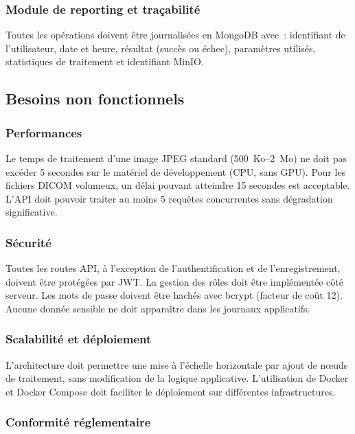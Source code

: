 \subsubsection{Module de reporting et traçabilité}

Toutes les opérations doivent être journalisées en MongoDB avec~: identifiant de l'utilisateur, date et heure, résultat (succès ou échec), paramètres utilisés, statistiques de traitement et identifiant MinIO.

\subsection{Besoins non fonctionnels}

\subsubsection{Performances}

Le temps de traitement d'une image JPEG standard (500~Ko--2~Mo) ne doit pas excéder 5 secondes sur le matériel de développement (CPU, sans GPU). Pour les fichiers DICOM volumeux, un délai pouvant atteindre 15 secondes est acceptable. L'API doit pouvoir traiter au moins 5 requêtes concurrentes sans dégradation significative.

\subsubsection{Sécurité}

Toutes les routes API, à l'exception de l'authentification et de l'enregistrement, doivent être protégées par JWT. La gestion des rôles doit être implémentée côté serveur. Les mots de passe doivent être hachés avec bcrypt (facteur de coût 12). Aucune donnée sensible ne doit apparaître dans les journaux applicatifs.

\subsubsection{Scalabilité et déploiement}

L'architecture doit permettre une mise à l'échelle horizontale par ajout de nœuds de traitement, sans modification de la logique applicative. L'utilisation de Docker et Docker Compose doit faciliter le déploiement sur différentes infrastructures.

\subsubsection{Conformité réglementaire}

